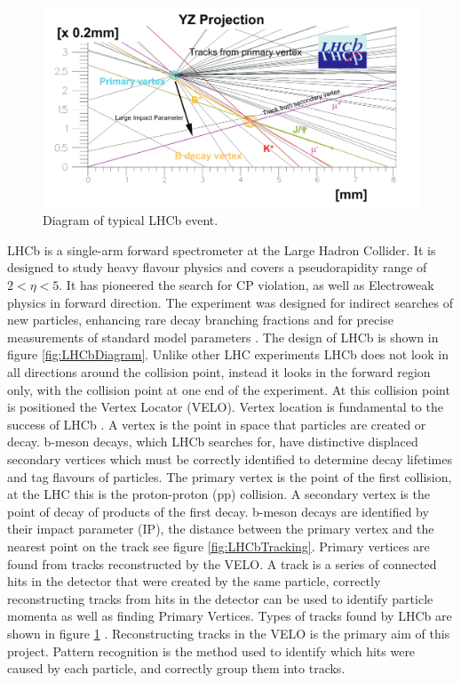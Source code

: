 \begin{figure}[h] %
\centering
\includegraphics[width=\textwidth]{EventDiagram.png}
\caption{Diagram of typical LHCb event.} 
\label{fig:EventDiagram} 
\end{figure}

LHCb is a single-arm forward spectrometer at the Large Hadron Collider. It is designed to study heavy flavour physics and covers a pseudorapidity range of $2 < \eta < 5$. It has pioneered the search for CP violation, as well as Electroweak physics in forward direction. The experiment was designed for indirect searches of new particles, enhancing rare decay branching fractions and for precise measurements of standard model parameters \citep{Collaboration2008TheLHC}. The design of LHCb is shown in figure \ref{fig:LHCbDiagram}. Unlike other LHC experiments LHCb does not look in all directions around the collision point, instead it looks in the forward region only, with the collision point at one end of the experiment. At this collision point is positioned the Vertex Locator (VELO). Vertex location is fundamental to the success of LHCb \citep{Barbosa-Marinho:504321}. A vertex is the point in space that particles are created or decay. b-meson decays, which LHCb searches for, have distinctive displaced secondary vertices which must be correctly identified to determine decay lifetimes and tag flavours of particles. The primary vertex is the point of the first collision, at the LHC this is the proton-proton (pp) collision. A secondary vertex is the point of decay of products of the first decay. b-meson decays are identified by their impact parameter (IP), the distance between the primary vertex and the nearest point on the track \cite{Kucharczyk:1756296} see figure \ref{fig:LHCbTracking}. Primary vertices are found from tracks reconstructed by the VELO. A track is a series of connected hits in the detector that were created by the same particle, correctly reconstructing tracks from hits in the detector can be used to identify particle momenta as well as finding Primary Vertices. Types of tracks found by LHCb are shown in figure \ref{fig:EventDiagram} \cite{LHCb2012TrackingLHCb}. Reconstructing tracks in the VELO is the primary aim of this project. Pattern recognition is the method used to identify which hits were caused by each particle, and correctly group them into tracks.

